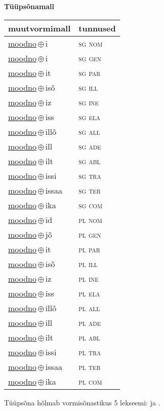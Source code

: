

\vspace{3.5em}
\noindent \begin{minipage}{\textwidth}
\noindent \textbf{Tüüpsõnamall \,}\\

\begin{sideways}
\begin{tabular}{l l}
muutvormimall & tunnused \\
\hline
\underline{moodno}\,$\oplus$\,i & \textsc{ sg nom } \\
\underline{moodno}\,$\oplus$\,i & \textsc{ sg gen } \\
\underline{moodno}\,$\oplus$\,it & \textsc{ sg par } \\
\underline{moodno}\,$\oplus$\,isõ & \textsc{ sg ill } \\
\underline{moodno}\,$\oplus$\,iz & \textsc{ sg ine } \\
\underline{moodno}\,$\oplus$\,iss & \textsc{ sg ela } \\
\underline{moodno}\,$\oplus$\,illõ & \textsc{ sg all } \\
\underline{moodno}\,$\oplus$\,ill & \textsc{ sg ade } \\
\underline{moodno}\,$\oplus$\,ilt & \textsc{ sg abl } \\
\underline{moodno}\,$\oplus$\,issi & \textsc{ sg tra } \\
\underline{moodno}\,$\oplus$\,issaa & \textsc{ sg ter } \\
\underline{moodno}\,$\oplus$\,ika & \textsc{ sg com } \\
\underline{moodno}\,$\oplus$\,id & \textsc{ pl nom } \\
\underline{moodno}\,$\oplus$\,jõ & \textsc{ pl gen } \\
\underline{moodno}\,$\oplus$\,it & \textsc{ pl par } \\
\underline{moodno}\,$\oplus$\,isõ & \textsc{ pl ill } \\
\underline{moodno}\,$\oplus$\,iz & \textsc{ pl ine } \\
\underline{moodno}\,$\oplus$\,iss & \textsc{ pl ela } \\
\underline{moodno}\,$\oplus$\,illõ & \textsc{ pl all } \\
\underline{moodno}\,$\oplus$\,ill & \textsc{ pl ade } \\
\underline{moodno}\,$\oplus$\,ilt & \textsc{ pl abl } \\
\underline{moodno}\,$\oplus$\,issi & \textsc{ pl tra } \\
\underline{moodno}\,$\oplus$\,issaa & \textsc{ pl ter } \\
\underline{moodno}\,$\oplus$\,ika & \textsc{ pl com } \\
\end{tabular}
\end{sideways}
\label{tab:tüüpsõnamall-moodnoi}

\end{minipage}

 
\vspace{1em}
\noindent Tüüpsõna hõlmab vormisõnastikus 5 lekseemi:  ja .
